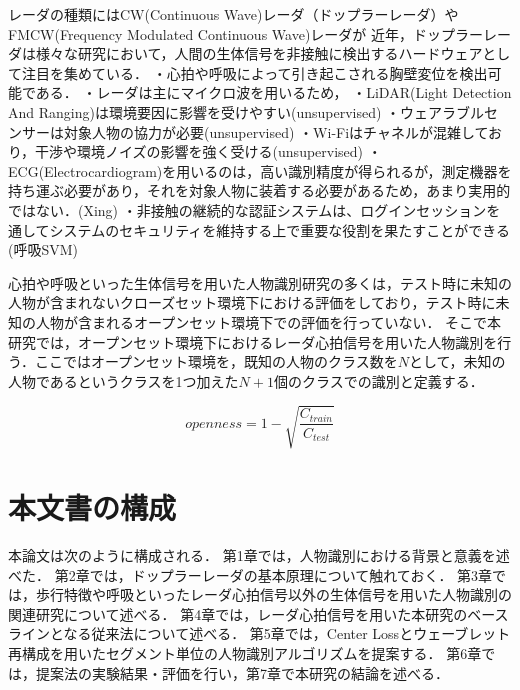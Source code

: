 レーダの種類にはCW(Continuous Wave)レーダ（ドップラーレーダ）やFMCW(Frequency Modulated Continuous Wave)レーダが
近年，ドップラーレーダは様々な研究において，人間の生体信号を非接触に検出するハードウェアとして注目を集めている．
・心拍や呼吸によって引き起こされる胸壁変位を検出可能である．
・レーダは主にマイクロ波を用いるため，
・LiDAR(Light Detection And Ranging)は環境要因に影響を受けやすい(unsupervised)
・ウェアラブルセンサーは対象人物の協力が必要(unsupervised)
・Wi-Fiはチャネルが混雑しており，干渉や環境ノイズの影響を強く受ける(unsupervised)
・ECG(Electrocardiogram)を用いるのは，高い識別精度が得られるが，測定機器を持ち運ぶ必要があり，それを対象人物に装着する必要があるため，あまり実用的ではない．(Xing)
・非接触の継続的な認証システムは、ログインセッションを通してシステムのセキュリティを維持する上で重要な役割を果たすことができる(呼吸SVM)

心拍や呼吸といった生体信号を用いた人物識別研究の多くは，テスト時に未知の人物が含まれないクローズセット環境下における評価をしており，テスト時に未知の人物が含まれるオープンセット環境下での評価を行っていない．
そこで本研究では，オープンセット環境下におけるレーダ心拍信号を用いた人物識別を行う．ここではオープンセット環境を，既知の人物のクラス数を$N$として，未知の人物であるというクラスを1つ加えた$N+1$個のクラスでの識別と定義する．


\begin{equation}\label{}
  openness = 1 - \sqrt{\frac{C_{train}}{C_{test}}}
\end{equation}

\section{本文書の構成}
本論文は次のように構成される．
第1章では，人物識別における背景と意義を述べた．
第2章では，ドップラーレーダの基本原理について触れておく．
第3章では，歩行特徴や呼吸といったレーダ心拍信号以外の生体信号を用いた人物識別の関連研究について述べる．
第4章では，レーダ心拍信号を用いた本研究のベースラインとなる従来法について述べる．
第5章では，Center Lossとウェーブレット再構成を用いたセグメント単位の人物識別アルゴリズムを提案する．
第6章では，提案法の実験結果・評価を行い，第7章で本研究の結論を述べる．


